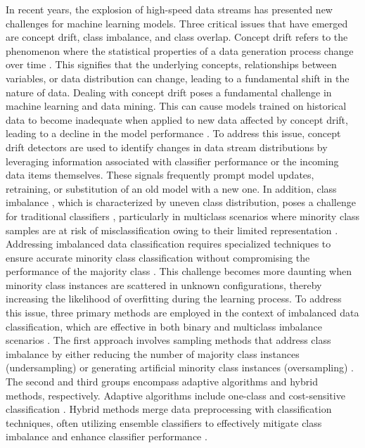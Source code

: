 In recent years, the explosion of high-speed data streams has presented new challenges for machine learning models. Three critical
issues that have emerged are concept drift, class imbalance, and class overlap. Concept drift refers to the phenomenon where the
statistical properties of a data generation process change over time \cite{yang2021concept}\cite{dong2019multistream}. This signifies that the underlying concepts, relationships
between variables, or data distribution can change, leading to a fundamental shift in the nature of data. Dealing with concept drift
poses a fundamental challenge in machine learning and data mining. This can cause models trained on historical data to become
inadequate when applied to new data affected by concept drift, leading to a decline in the model performance \cite{dong2019multistream}. To address this issue,
concept drift detectors are used to identify changes in data stream distributions by leveraging information associated with classifier
performance or the incoming data items themselves. These signals frequently prompt model updates, retraining, or substitution of an
old model with a new one.
In addition, class imbalance \cite{dong2019multistream}\cite{pan2009survey}, which is characterized by uneven class distribution, poses a challenge for traditional classifiers
\cite{zhuang2020comprehensive}, particularly in multiclass scenarios where minority class samples are at risk of misclassification owing to their limited representation \cite{wang2018systematic}. Addressing imbalanced data classification requires specialized techniques to ensure accurate minority class classification without compromising the performance of the majority class \cite{sun2009classification}\cite{charte2015addressing}\cite{charte2015mlsmote}. This challenge becomes more daunting when minority class instances are scattered in unknown configurations, thereby increasing the likelihood of overfitting during the learning process. To
address this issue, three primary methods are employed in the context of imbalanced data classification, which are effective in both
binary and multiclass imbalance scenarios \cite{daniels2017addressing}. The first approach involves sampling methods that address class imbalance by either
reducing the number of majority class instances (undersampling) or generating artificial minority class instances (oversampling)
\cite{liu2018making}\cite{japkowicz1995novelty}\cite{lopez2012analysis}. The second and third groups encompass adaptive algorithms and hybrid methods, respectively. Adaptive algorithms include
one-class and cost-sensitive classification \cite{zhang2020towards}. Hybrid methods merge data preprocessing with classification techniques, often utilizing ensemble classifiers to effectively mitigate class imbalance and enhance classifier performance \cite{chawla2003smoteboost}\cite{wang2010negative}\cite{bhowan2012evolving}.
